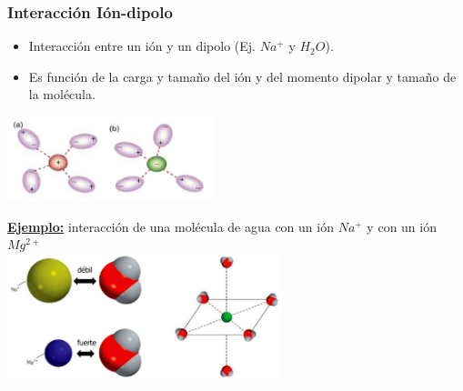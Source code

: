         \subsubsection{Interacción Ión-dipolo}
            \begin{itemize}
                \item Interacción entre un ión y un dipolo (Ej. $Na^+$ y $H_2O$).
                \item Es función de la carga y tamaño del ión y del momento dipolar y tamaño de la molécula.
            \end{itemize}
            \begin{center} \includegraphics[width=6cm]{./imagenes/iteraccionIonDipolo.png} \end{center}
            \begin{center} \textbf{\underline{Ejemplo:}} interacción de una molécula de agua con un ión $Na^+$ y con un ión $Mg^{2+}$ \\[10pt] \includegraphics[width=8cm]{./imagenes/interaccionAguaNaMASMg2MAS.png} \end{center}
            

